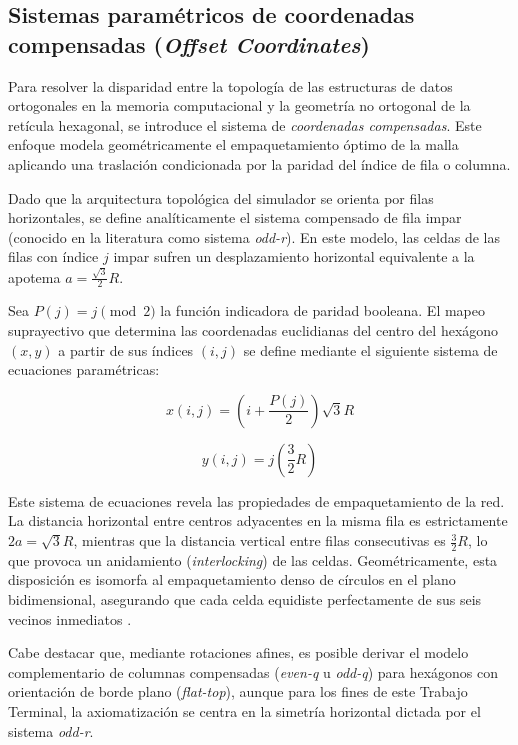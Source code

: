 \subsection{Sistemas paramétricos de coordenadas compensadas (\textit{Offset Coordinates})}

Para resolver la disparidad entre la topología de las estructuras de datos ortogonales en la memoria computacional y la geometría no ortogonal de la retícula hexagonal, se introduce el sistema de \textit{coordenadas compensadas}. Este enfoque modela geométricamente el empaquetamiento óptimo de la malla aplicando una traslación condicionada por la paridad del índice de fila o columna.

Dado que la arquitectura topológica del simulador se orienta por filas horizontales, se define analíticamente el sistema compensado de fila impar (conocido en la literatura como sistema \textit{odd-r}). En este modelo, las celdas de las filas con índice $j$ impar sufren un desplazamiento horizontal equivalente a la apotema $a = \frac{\sqrt{3}}{2}R$.

Sea $P(j) = j \pmod 2$ la función indicadora de paridad booleana. El mapeo suprayectivo que determina las coordenadas euclidianas del centro del hexágono $(x, y)$ a partir de sus índices $(i,j)$ se define mediante el siguiente sistema de ecuaciones paramétricas:

\begin{equation}
    x(i, j) = \left( i + \frac{P(j)}{2} \right) \sqrt{3} R
\end{equation}

\begin{equation}
    y(i, j) = j \left( \frac{3}{2} R \right)
\end{equation}

Este sistema de ecuaciones revela las propiedades de empaquetamiento de la red. La distancia horizontal entre centros adyacentes en la misma fila es estrictamente $2a = \sqrt{3}R$, mientras que la distancia vertical entre filas consecutivas es $\frac{3}{2}R$, lo que provoca un anidamiento (\textit{interlocking}) de las celdas. Geométricamente, esta disposición es isomorfa al empaquetamiento denso de círculos en el plano bidimensional, asegurando que cada celda equidiste perfectamente de sus seis vecinos inmediatos \cite{Wolfram2002}.

Cabe destacar que, mediante rotaciones afines, es posible derivar el modelo complementario de columnas compensadas (\textit{even-q} u \textit{odd-q}) para hexágonos con orientación de borde plano (\textit{flat-top}), aunque para los fines de este Trabajo Terminal, la axiomatización se centra en la simetría horizontal dictada por el sistema \textit{odd-r}.

